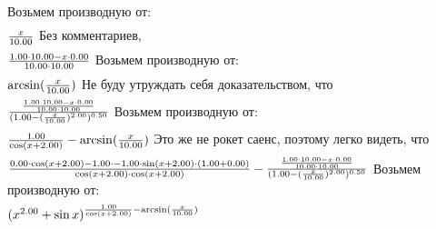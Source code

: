 Возьмем производную от:
\begin{gather}
\end{gather}
\begin{math}
\frac {x }{10.00 }\\
\end{math}
Без комментариев, 
\begin{gather}
\end{gather}
\begin{math}
\frac {1.00 \cdot 10.00 - x \cdot 0.00 }{10.00 \cdot 10.00 }\\
\end{math}
Возьмем производную от:
\begin{gather}
\end{gather}
\begin{math}
\arcsin (\frac {x }{10.00 })\\
\end{math}
Не буду утруждать себя доказательством, что
\begin{gather}
\end{gather}
\begin{math}
\frac {\frac {1.00 \cdot 10.00 - x \cdot 0.00 }{10.00 \cdot 10.00 }}{(1.00 - (\frac {x }{10.00 })^ {2.00 })^ {0.50 }}\\
\end{math}
Возьмем производную от:
\begin{gather}
\end{gather}
\begin{math}
\frac {1.00 }{\cos (x + 2.00 )}- \arcsin (\frac {x }{10.00 })\\
\end{math}
Это же не рокет саенс, поэтому легко видеть, что
\begin{gather}
\end{gather}
\begin{math}
\frac {0.00 \cdot \cos (x + 2.00 )- 1.00 \cdot -1.00 \cdot \sin (x + 2.00 )\cdot (1.00 + 0.00 )}{\cos (x + 2.00 )\cdot \cos (x + 2.00 )}- \frac {\frac {1.00 \cdot 10.00 - x \cdot 0.00 }{10.00 \cdot 10.00 }}{(1.00 - (\frac {x }{10.00 })^ {2.00 })^ {0.50 }}\\
\end{math}
Возьмем производную от:
\begin{gather}
\end{gather}
\begin{math}
(x ^ {2.00 }+ \sin x )^ {\frac {1.00 }{\cos (x + 2.00 )}- \arcsin (\frac {x }{10.00 })}\\
\end{math}
